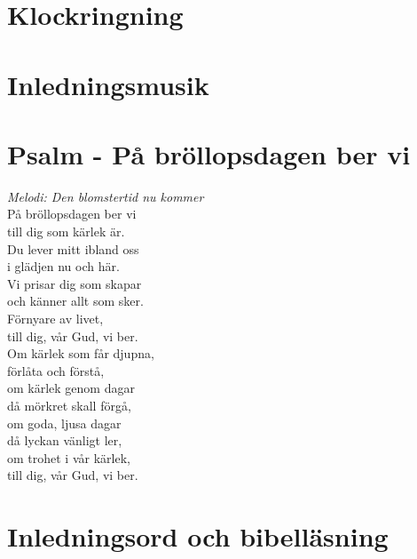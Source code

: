\documentclass[a5paper, 12pt]{article}
\begin{document}
	
\begin{center}
		
		
	\section{Klockringning}
	\vspace{0.4cm}
	
	\section{Inledningsmusik}
	\vspace{0.4cm}
	
	\section{Psalm - På bröllopsdagen ber vi}
	\vspace{-0.3cm}
	\textit{Melodi: Den blomstertid nu kommer} \\
	\vspace{0.2cm}
	På bröllopsdagen ber vi    \\
	till dig som kärlek är.    \\
	Du lever mitt ibland oss   \\
	i glädjen nu och här.      \\
	Vi prisar dig som skapar   \\
	och känner allt som sker.  \\
	Förnyare av livet,         \\
	till dig, vår Gud, vi ber. \\
	\vspace{0.5cm}
	Om kärlek som får djupna, \\
	förlåta och förstå,          \\
	om kärlek genom dagar        \\
	då mörkret skall förgå,      \\
	om goda, ljusa dagar         \\
	då lyckan vänligt ler,       \\
	om trohet i vår kärlek,      \\
	till dig, vår Gud, vi ber.   \\
	\vspace{0.2cm}

	
	\section{Inledningsord och bibelläsning}	
	\vspace{0.4cm}
	

\end{center}
\end{document}
